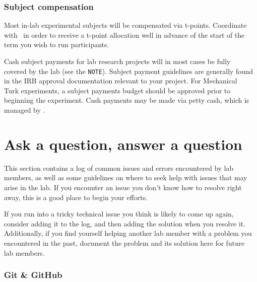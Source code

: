 \documentclass{tufte-book} %
\begin{document}
 \subsection{Subject compensation}
 Most in-lab experimental subjects will be compensated via t-points.
 Coordinate with \coordinator~in order to receive a t-point allocation
 well in advance of the start of the term you wish to run
 participants.

 Cash subject payments for lab research projects will in most cases be fully covered by
 the lab (see the \texttt{NOTE}).  Subject payment guidelines are generally found in the IRB
 approval documentation relevant to your project.  For Mechanical Turk
 experiments, a subject payments budget should be approved prior to
 beginning the experiment.  Cash payments may be made via petty cash,
 which is managed by \coordinator.


\chapter{Ask a question, answer a question}\label{ch:faq}
This section contains a log of common issues and errors encountered by lab members, as well as some guidelines on where to seek help with issues that may arise in the lab.  If you encounter an issue you don't know how to resolve right away, this is a good place to begin your efforts.


\noindent If you run into a tricky technical issue you think is likely to come up again, consider adding it to the log, and then adding the solution when you resolve it.  Additionally, if you find yourself helping another lab member with a problem you encountered in the past, document the problem and its solution here for future lab members.

\subsection{Git \& GitHub}
\end{document}
